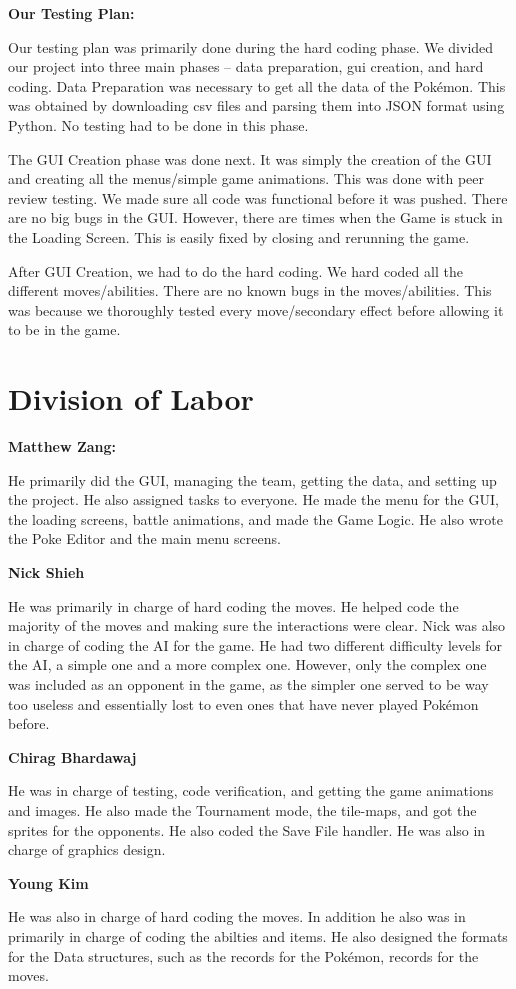 \documentclass{scrreprt}
\begin{document}
\textbf{Our Testing Plan: }

Our testing plan was primarily done during the hard coding phase. We divided our project into three main phases -- data preparation, gui creation, and hard coding. Data Preparation was necessary to get all the data of the Pok\'emon. This was obtained by downloading csv files and parsing them into JSON format using Python. No testing had to be done in this phase.

The GUI Creation phase was done next. It was simply the creation of the GUI and creating all the menus/simple game animations. This was done with peer review testing. We made sure all code was functional before it was pushed. There are no big bugs in the GUI. However, there are times when the Game is stuck in the Loading Screen. This is easily fixed by closing and rerunning the game. 

After GUI Creation, we had to do the hard coding. We hard coded all the different moves/abilities. There are no known bugs in the moves/abilities. This was because we thoroughly tested every move/secondary effect before allowing it to be in the game. 

\section{Division of Labor} 

\textbf{Matthew Zang:}

He primarily did the GUI, managing the team, getting the data, and setting up the project. He also assigned tasks to everyone. He made the menu for the GUI, the loading screens, battle animations, and made the Game Logic. He also wrote the Poke Editor and the main menu screens.

\textbf{Nick Shieh}

He was primarily in charge of hard coding the moves. He helped code the majority of the moves and making sure the interactions were clear. Nick was also in charge of coding the AI for the game. He had two different difficulty levels for the AI, a simple one and a more complex one. However, only the complex one was included as an opponent in the game, as the simpler one served to be way too useless and essentially lost to even ones that have never played Pok\'emon before. 

\textbf{Chirag Bhardawaj} 

He was in charge of testing, code verification, and getting the game animations and images. He also made the Tournament mode, the tile-maps, and got the sprites for the opponents. He also coded the Save File handler. He was also in charge of graphics design. 

\textbf{Young Kim} 
 
 He was also in charge of hard coding the moves. In addition he also was in primarily in charge of coding the abilties and items. He also designed the formats for the Data structures, such as the records for the Pok\'emon, records for the moves. 
 
\end{document}
